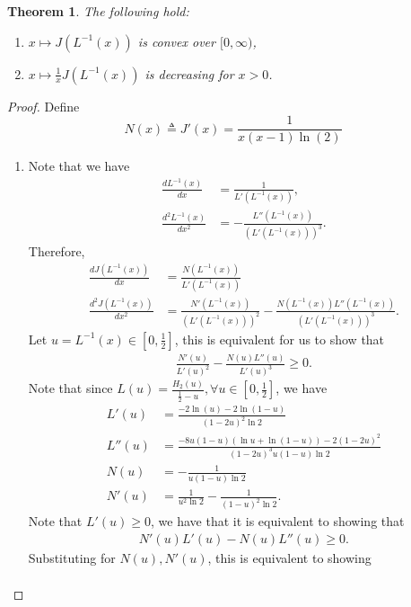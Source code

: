 \documentclass[conference,letterpaper,onecolumn]{IEEEtran}
\theoremstyle{plain}%
\newtheorem{thm}{Theorem}
\begin{document}
\begin{thm}The following hold:
    \label{th:knwnprop}
    \begin{enumerate}
    \item $x\mapsto J(L^{-1}(x))$ is convex over $[0,\infty)$,
    \item 
    $x\mapsto \frac{1}{x}J(L^{-1}(x))$ is  decreasing for $x>0$.
    \end{enumerate}
\end{thm}
\begin{proof}
Define 
$$N(x)\triangleq J'(x)=\frac{1}{x(x-1)\ln(2)}$$
\begin{enumerate}
    \item
    Note that we have
    \begin{align*}
        \frac{dL^{-1}(x)}{dx} &= \frac{1}{L'(L^{-1}(x))},\\
        \frac{d^2L^{-1}(x)}{dx^2} &= -\frac{L''(L^{-1}(x))}{(L'(L^{-1}(x)))^3}.
    \end{align*}
    Therefore,
    \begin{align*}
        \frac{d J(L^{-1}(x))}{dx}&= \frac{N(L^{-1}(x))}{L'(L^{-1}(x))}\\
        \frac{d^2 J(L^{-1}(x))}{dx^2}&= \frac{N'(L^{-1}(x))}{(L'(L^{-1}(x)))^2}-\frac{N(L^{-1}(x))L''(L^{-1}(x))}{(L'(L^{-1}(x)))^3}.
    \end{align*}
    Let $u = L^{-1}(x) \in \left[0,\frac{1}{2}\right]$, this is equivalent for us to show that
    \begin{align*}
        \frac{N'(u)}{L'(u)^2} - \frac{N(u)L''(u)}{L'(u)^3} \geq 0.
    \end{align*}
    Note that since $L(u) = \frac{H_2(u)}{\frac{1}{2} - u}, \forall u \in \left[0,\frac{1}{2}\right]$, we have 
    \begin{align*}
        L'(u) &= \frac{-2\ln(u) - 2\ln(1-u)}{(1 - 2u)^2\ln2}\\
        L''(u) &= \frac{-8u(1-u)(\ln u + \ln(1-u)) - 2(1-2u)^2}{(1 - 2u)^3u(1-u)\ln2}\\
        N(u) &= -\frac{1}{u(1-u)\ln 2}\\
        N'(u) &= \frac{1}{u^2\ln2} - \frac{1}{(1 - u)^2 \ln2}.
    \end{align*}
    Note that $L'(u) \geq 0$, we have that it is equivalent to showing that
    \begin{align*}
        N'(u)L'(u) - N(u)L''(u)\geq 0.
    \end{align*}
    Substituting for $N(u), N'(u)$, this is equivalent to showing
    \begin{align*}

\end{align*}
\end{enumerate}
\end{proof}
\end{document}
